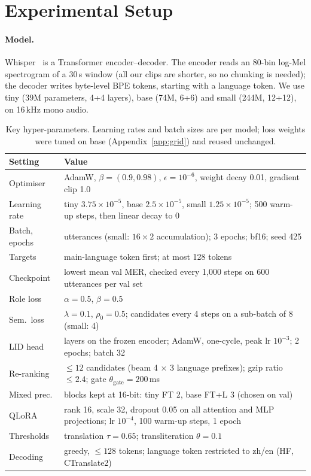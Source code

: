 \section{Experimental Setup}
\label{sec:setup}

\paragraph{Model.}
Whisper~\citep{radford2023whisper} is a Transformer encoder--decoder. The encoder reads an 80-bin log-Mel spectrogram of a 30\,s window (all our clips are shorter, so no chunking is needed); the decoder writes byte-level BPE tokens, starting with a language token. We use tiny (39M parameters, 4+4 layers), base (74M, 6+6) and small (244M, 12+12), on 16\,kHz mono audio.

\begin{table}[t]
\centering
\small
\setlength{\tabcolsep}{3pt}
\begin{tabular}{l>{\raggedright\arraybackslash}p{}}
\toprule
Setting & Value \\
\midrule
Optimiser & AdamW, $\beta=(0.9, 0.98)$, $\epsilon=10^{-6}$, weight decay 0.01, gradient clip 1.0 \\
Learning rate & tiny $3.75{\times}10^{-5}$, base $2.5{\times}10^{-5}$, small $1.25{\times}10^{-5}$; 500 warm-up steps, then linear decay to 0 \\
Batch, epochs & 32 utterances (small: $16\times2$ accumulation); 3 epochs; bf16; seed 425 \\
Targets & main-language token first; at most 128 tokens \\
Checkpoint & lowest mean val MER, checked every 1{,}000 steps on 600 utterances per val set \\
Role loss & $\alpha=0.5$, $\beta=0.5$ \\
Sem.\ loss & $\lambda=0.1$, $\rho_0=0.5$; candidates every 4 steps on a sub-batch of 8 (small: 4) \\
LID head & 2 layers on the frozen encoder; AdamW, one-cycle, peak lr $10^{-3}$; 2 epochs; batch 32 \\
Re-ranking & $\le12$ candidates (beam 4 $\times$ 3 language prefixes); gzip ratio $\le2.4$; gate $\theta_{\text{gate}}=200$\,ms \\
Mixed prec. & blocks kept at 16-bit: tiny FT 2, base FT+L 3 (chosen on val) \\
QLoRA & rank 16, scale 32, dropout 0.05 on all attention and MLP projections; lr $10^{-4}$, 100 warm-up steps, 1 epoch \\
Thresholds & translation $\tau=0.65$; transliteration $\theta=0.1$ \\
Decoding & greedy, $\le128$ tokens; language token restricted to zh/en (HF, CTranslate2) \\
\bottomrule
\end{tabular}
\caption{Key hyper-parameters. Learning rates and batch sizes are per model; loss weights were tuned on base (Appendix~\ref{app:grid}) and reused unchanged.}
\label{tab:hparams}
\end{table}

